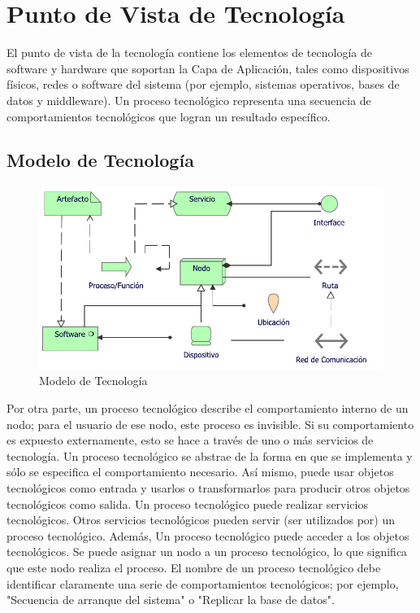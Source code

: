 \section{Punto de Vista de Tecnología}

El punto de vista de la tecnología contiene los elementos de tecnología de software y hardware que soportan la Capa de Aplicación, tales como dispositivos físicos, redes o software del sistema (por ejemplo, sistemas operativos, bases de datos y middleware). Un proceso tecnológico representa una secuencia de comportamientos tecnológicos que logran un resultado específico.

\subsection{Modelo de Tecnología}
\begin{figure}[h!]
	\centering
	\includegraphics[width=.8\linewidth]{imgs/modelo/Tecnologia.pdf}
	\caption{Modelo de Tecnología}
\end{figure}

Por otra parte, un proceso tecnológico describe el comportamiento interno de un nodo; para el usuario de ese nodo, este proceso es invisible. Si su comportamiento es expuesto externamente, esto se hace a través de uno o más servicios de tecnología. Un proceso tecnológico se abstrae de la forma en que se implementa y sólo se especifica el comportamiento necesario. Así mismo, puede usar objetos tecnológicos como entrada y usarlos o transformarlos para producir otros objetos tecnológicos como salida. Un proceso tecnológico puede realizar servicios tecnológicos. Otros servicios tecnológicos pueden servir (ser utilizados por) un proceso tecnológico. Además, Un proceso tecnológico puede acceder a los objetos tecnológicos. Se puede asignar un nodo a un proceso tecnológico, lo que significa que este nodo realiza el proceso. El nombre de un proceso tecnológico debe identificar claramente una serie de comportamientos tecnológicos; por ejemplo, "Secuencia de arranque del sistema" o "Replicar la base de datos".

